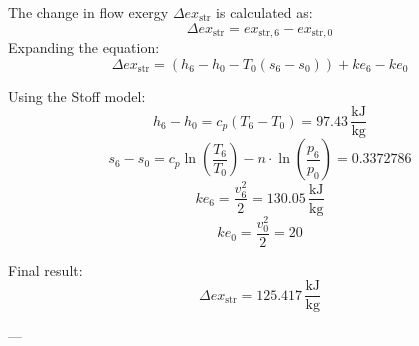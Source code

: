 The change in flow exergy \( \Delta ex_{\text{str}} \) is calculated as:  
\[
\Delta ex_{\text{str}} = ex_{\text{str},6} - ex_{\text{str},0}
\]  
Expanding the equation:  
\[
\Delta ex_{\text{str}} = (h_6 - h_0 - T_0 (s_6 - s_0)) + ke_6 - ke_0
\]  

Using the Stoff model:  
\[
h_6 - h_0 = c_p (T_6 - T_0) = 97.43 \, \frac{\text{kJ}}{\text{kg}}
\]  
\[
s_6 - s_0 = c_p \ln\left(\frac{T_6}{T_0}\right) - n \cdot \ln\left(\frac{p_6}{p_0}\right) = 0.3372786
\]  
\[
ke_6 = \frac{v_6^2}{2} = 130.05 \, \frac{\text{kJ}}{\text{kg}}
\]  
\[
ke_0 = \frac{v_0^2}{2} = 20
\]  

Final result:  
\[
\Delta ex_{\text{str}} = 125.417 \, \frac{\text{kJ}}{\text{kg}}
\]  

---